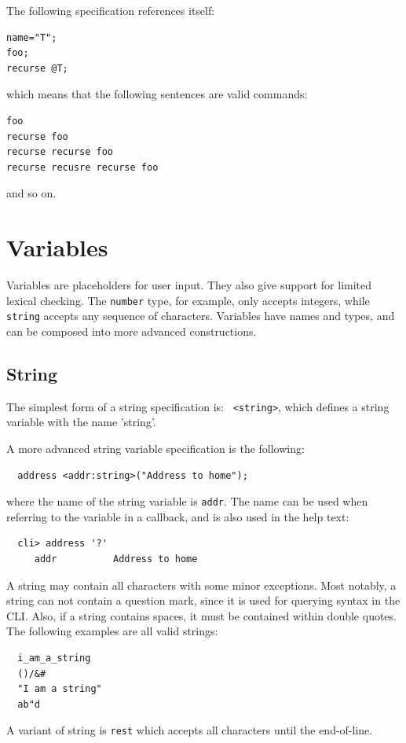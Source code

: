 \documentclass[a4paper, 10pt] {article}
\begin{document}
The following specification references itself:
\begin{verbatim}
name="T";
foo;
recurse @T;
\end{verbatim}
which means that the following sentences are valid commands:
\begin{verbatim}
foo
recurse foo
recurse recurse foo
recurse recusre recurse foo
\end{verbatim}
and so on.



\section{Variables}
\label{sec:variables}
Variables are placeholders for user input. They also give support for
limited lexical checking. The {\tt number} type, for example, only
accepts integers, while {\tt string} accepts any sequence of
characters. Variables have names and types, and can be composed into more
advanced constructions.

\subsection{String}
The simplest form of a string specification is: {\tt
<string>}, which defines a string variable with the name 'string'.

A more advanced string variable specification is the following:
\begin{verbatim}
  address <addr:string>("Address to home");
\end{verbatim}
where the name of the string variable is {\tt addr}. The name can be used when referring to the variable in a callback, and is also used in the help text:
\begin{verbatim}
  cli> address '?'
     addr          Address to home
\end{verbatim}

A string may contain all characters with some minor exceptions. Most
notably, a string can not contain a question mark, since it is used
for querying syntax in the CLI.  Also, if a string contains spaces, it
must be contained within double quotes.  The following examples are all valid
strings:
\begin{verbatim}
  i_am_a_string
  ()/&#
  "I am a string"
  ab"d
\end{verbatim}

A variant of string is {\tt rest} which accepts all characters until
the end-of-line. 
\end{document}
